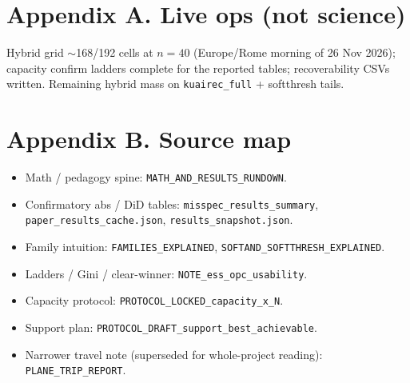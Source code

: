 \documentclass[11pt]{article}
\newcommand{\phonesection}[1]{\Needspace{8\baselineskip}\section*{#1}}
\begin{document}
\phonesection{Appendix A. Live ops
(not science)}

{\footnotesize
Hybrid grid $\sim$168/192 cells at $n{=}40$
(Europe/Rome morning of 26 Nov 2026);
capacity confirm ladders complete for the
reported tables; recoverability CSVs written.
Remaining hybrid mass on
\texttt{kuairec\_full} + softthresh tails.
\par}

\phonesection{Appendix B. Source map}

{\footnotesize\raggedright
\begin{itemize}
  \item Math / pedagogy spine:
        \texttt{MATH\_AND\_RESULTS\_RUNDOWN}.
  \item Confirmatory abs / DiD tables:
        \texttt{misspec\_results\_summary},
        \texttt{paper\_results\_cache.json},
        \texttt{results\_snapshot.json}.
  \item Family intuition:
        \texttt{FAMILIES\_EXPLAINED},
        \texttt{SOFTAND\_SOFTTHRESH\_EXPLAINED}.
  \item Ladders / Gini / clear-winner:
        \texttt{NOTE\_ess\_opc\_usability}.
  \item Capacity protocol:
        \texttt{PROTOCOL\_LOCKED\_capacity\_x\_N}.
  \item Support plan:
        \texttt{PROTOCOL\_DRAFT\_support\_best\_achievable}.
  \item Narrower travel note (superseded
        for whole-project reading):
        \texttt{PLANE\_TRIP\_REPORT}.
\end{itemize}
\par}

\vspace{0.4em}
{\footnotesize\raggedright
}
\end{document}
